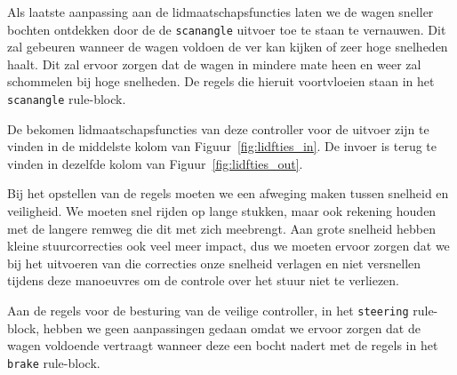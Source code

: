 Als laatste aanpassing aan de lidmaatschapsfuncties laten we de wagen sneller bochten ontdekken door de de \texttt{scanangle} uitvoer toe te staan te vernauwen. Dit zal gebeuren wanneer de wagen voldoen de ver kan kijken of zeer hoge snelheden haalt. Dit zal ervoor zorgen dat de wagen in mindere mate heen en weer zal schommelen bij hoge snelheden. De regels die hieruit voortvloeien staan in het \texttt{scanangle} rule-block.

De bekomen lidmaatschapsfuncties van deze controller voor de uitvoer zijn te vinden in de 
middelste kolom van Figuur~\ref{fig:lidfties_in}. De invoer is terug te vinden in dezelfde kolom van Figuur~\ref{fig:lidfties_out}.

Bij het opstellen van de regels moeten we een afweging maken tussen snelheid en 
veiligheid. We moeten snel rijden op lange stukken, maar ook rekening houden 
met de langere remweg die dit met zich meebrengt. Aan grote snelheid hebben 
kleine stuurcorrecties ook veel meer impact, dus we moeten ervoor zorgen dat we 
bij het uitvoeren van die correcties onze snelheid verlagen en niet 
versnellen tijdens deze manoeuvres om de controle over het stuur niet te 
verliezen.

Aan de regels voor de besturing van de veilige controller, in het \texttt{steering} rule-block, hebben we geen aanpassingen gedaan omdat we ervoor zorgen dat de wagen voldoende vertraagt wanneer deze een bocht nadert met de regels in het \texttt{brake} rule-block.

